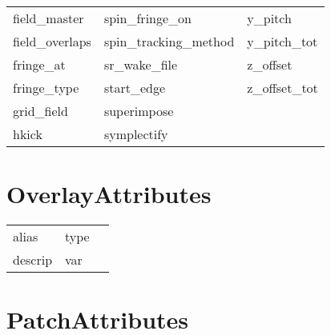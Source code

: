 \begin{tabular}{lll}
field_master                & spin_fringe_on              & y_pitch                     \\
field_overlaps              & spin_tracking_method        & y_pitch_tot                 \\
fringe_at                   & sr_wake_file                & z_offset                    \\
fringe_type                 & start_edge                  & z_offset_tot                \\
grid_field                  & superimpose                 &                             \\
hkick                       & symplectify                 &                             \\
 \bottomrule
 \end{tabular}
 \vfill
 
 \section{OverlayAttributes}
 \label{s:list.overlay}
 
 \begin{tabular}{lll} \toprule
alias                       & type                        &                             \\
descrip                     & var                         &                             \\
 \bottomrule
 \end{tabular}
 \vfill
 
 \section{PatchAttributes}
 \label{s:list.patch}
 
